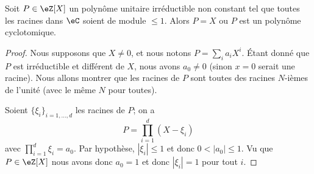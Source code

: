 \begin{theorem} \label{ThojCJpFW}
    Soit \( P\in \eZ[X]\) un polynôme unitaire irréductible non constant tel que toutes les racines dans \( \eC\) soient de module \( \leq 1\). Alors \( P=X\) ou \( P\) est un polynôme cyclotomique.
\end{theorem}

\begin{proof}
    Nous supposons que \( X\neq 0\), et nous notons \( P=\sum_ia_iX^i\). Étant donné que \( P\) est irréductible et différent de \( X\), nous avons \( a_0\neq 0\) (sinon \( x=0\) serait une racine). Nous allons montrer que les racines de \( P\) sont toutes des racines \( N\)-ièmes de l'unité (avec le même \( N\) pour toutes).

    Soient \( \{ \xi_i \}_{i=1,\ldots, d}\) les racines de \( P\); on a
    \begin{equation}
        P=\prod_{i=1}^d(X-\xi_i)
    \end{equation}
    avec \( \prod_{i=1}^d\xi_i=a_0\). Par hypothèse, \( | \xi_i |\leq 1\) et donc \( 0<| a_0 |\leq 1\). Vu que \( P\in \eZ[X]\) nous avons donc \( a_0=1\) et donc \( | \xi_i |=1\) pour tout \( i\).


\end{proof}
